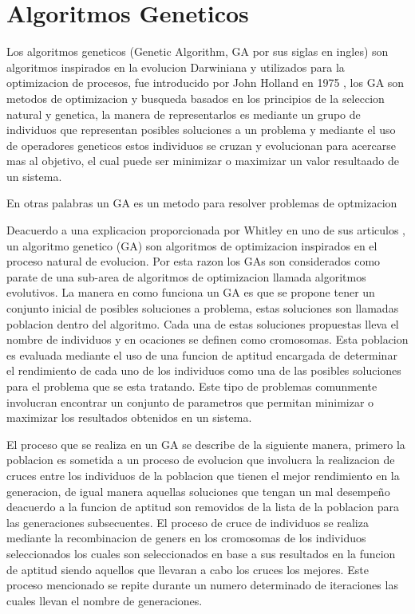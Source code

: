 \section{Algoritmos Geneticos}
\label{section:genetic-algorithms}

Los algoritmos geneticos (Genetic Algorithm, GA por sus siglas en ingles) son
algoritmos inspirados en la evolucion Darwiniana y utilizados para la
optimizacion de procesos, fue introducido por John Holland en 1975
\cite{Holland1975}, los GA son metodos de optimizacion y busqueda basados en los
principios de la seleccion natural y genetica, la manera de representarlos es
mediante un grupo de individuos que representan posibles soluciones a un
problema y mediante el uso de operadores geneticos estos individuos se cruzan y
evolucionan para acercarse mas al objetivo, el cual puede ser minimizar o
maximizar un valor resultaado de un sistema.

En otras palabras un GA es un metodo para resolver problemas de optmizacion

Deacuerdo a una explicacion proporcionada por Whitley en uno de sus articulos
\cite{Whitley1994}, un algoritmo genetico (GA) son algoritmos de optimizacion
inspirados en el proceso natural de evolucion. Por esta razon los GAs son
considerados como parate de una sub-area de algoritmos de optimizacion llamada
algoritmos evolutivos. La manera en como funciona un GA es que se propone tener
un conjunto inicial de posibles soluciones a problema, estas soluciones son
llamadas poblacion dentro del algoritmo. Cada una de estas soluciones propuestas
lleva el nombre de individuos y en ocaciones se definen como cromosomas. Esta
poblacion es evaluada mediante el uso de una funcion de aptitud encargada de
determinar el rendimiento de cada uno de los individuos como una de las posibles
soluciones para el problema que se esta tratando. Este tipo de problemas
comunmente involucran encontrar un conjunto de parametros que permitan minimizar
o maximizar los resultados obtenidos en un sistema.

El proceso que se realiza en un GA se describe de la siguiente manera, primero
la poblacion es sometida a un proceso de evolucion que involucra la realizacion
de cruces entre los individuos de la poblacion que tienen el mejor rendimiento
en la generacion, de igual manera aquellas soluciones que tengan un mal
desempeño deacuerdo a la funcion de aptitud son removidos de la lista de la
poblacion para las generaciones subsecuentes. El proceso de cruce de individuos
se realiza mediante la recombinacion de geners en los cromosomas de los
individuos seleccionados los cuales son seleccionados en base a sus resultados
en la funcion de aptitud siendo aquellos que llevaran a cabo los cruces los
mejores. Este proceso mencionado se repite durante un numero determinado de
iteraciones las cuales llevan el nombre de generaciones.


